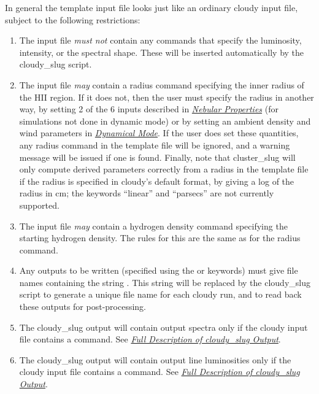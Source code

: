 \documentclass[letterpaper,10pt,english]{sphinxmanual}
\begin{document}
In general the template input file looks just like an ordinary cloudy
input file, subject to the following restrictions:
\begin{enumerate}
\item {} 
The input file \emph{must not} contain any commands that specify the
luminosity, intensity, or the spectral shape. These will be
inserted automatically by the cloudy\_slug script.

\item {} 
The input file \emph{may} contain a radius command specifying the inner
radius of the HII region. If it does not, then the user must
specify the radius in another way, by setting 2 of the 6 inputs
described in {\hyperref[cloudy:sssec\string-cloudy\string-nebular\string-properties]{\emph{Nebular Properties}}} (for
simulations not done in dynamic mode) or by setting an ambient
density and wind parameters in
{\hyperref[cloudy:sssec\string-cloudy\string-dynamical\string-cluster\string-mode]{\emph{Dynamical Mode}}}. If the user does
set these quantities, any radius command in the template file will be
ignored, and a warning message will be issued if one is
found. Finally, note that cluster\_slug will only compute derived
parameters correctly from a radius in the template file if the
radius is specified in cloudy's default format, by giving a log of
the radius in cm; the keywords ``linear'' and ``parsecs'' are not
currently supported.

\item {} 
The input file \emph{may} contain a hydrogen density command specifying
the starting hydrogen density. The rules for this are the same as
for the radius command.

\item {} 
Any outputs to be written (specified using the  or
 keywords) must give file names containing the string
. This string will be replaced by the
cloudy\_slug script to generate a unique file name for each cloudy
run, and to read back these outputs for post-processing.

\item {} 
The cloudy\_slug output will contain output spectra only if the
cloudy input file contains a  command. See
{\hyperref[cloudy:ssec\string-cloudy\string-output]{\emph{Full Description of cloudy\_slug Output}}}.

\item {} 
The cloudy\_slug output will contain output line luminosities only
if the cloudy input file contains a  command. See {\hyperref[cloudy:ssec\string-cloudy\string-output]{\emph{Full Description of cloudy\_slug Output}}}.


\end{enumerate}
\end{document}
